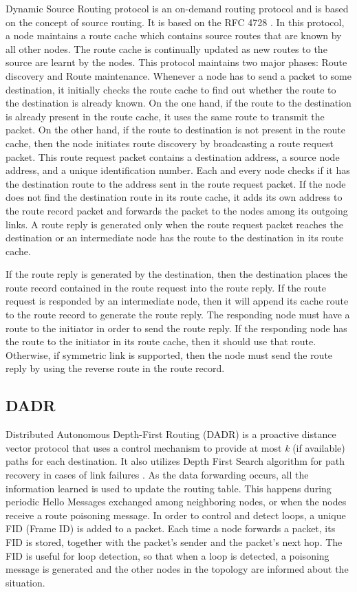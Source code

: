 \documentclass[11pt,draftclsnofoot,onecolumn]{IEEEtran}
\begin{document}
Dynamic Source Routing protocol is an on-demand routing protocol and is based on the concept of source routing. It is based on the RFC 4728 \cite{Johnson2007} . In this protocol, a node maintains a route cache which contains source routes that are known by all other nodes. The route cache is continually updated as new routes to the source are learnt by the nodes. This protocol maintains two major phases: Route discovery and Route maintenance. Whenever a node has to send a packet to some destination, it initially checks the route cache to find out whether the route to the destination is already known. On the one hand, if the route to the destination is already present in the route cache, it uses the same route to transmit the packet. On the other hand, if the route to destination is not present in the route cache, then the node initiates route discovery by broadcasting a route request packet. This route request packet contains a destination address, a source node address, and a unique identification number. Each and every node checks if it has the destination route to the address sent in the route request packet. If the node does not find the destination route in its route cache, it adds its own address to the route record packet and forwards the packet to the nodes among its outgoing links. A route reply is generated only when the route request packet reaches the destination or an intermediate node has the route to the destination in its route cache. 
	
If the route reply is generated by the destination, then the destination places the route record contained in the route request into the route reply. If the route request is responded by an intermediate node, then it will append its cache route to the route record to generate the route reply. The responding node must have a route to the initiator in order to send the route reply. If the responding node has the route to the initiator in its route cache, then it should use that route. Otherwise, if symmetric link is supported, then the node must send the route reply by using the reverse route in the route record. 

\subsection{DADR}\label{dadr}

Distributed Autonomous Depth-First Routing (DADR) \cite{Iwao2009} is a proactive distance vector protocol that uses a control mechanism to provide at most \textit{k} (if available) paths for each destination. It also utilizes Depth First Search algorithm for path recovery in cases of link failures \cite{Cespedes2012}. As the data forwarding occurs, all the information learned is used to update the routing table. This happens during periodic Hello Messages exchanged among neighboring nodes, or when the nodes receive a route poisoning message. In order to control and detect loops, a unique FID (Frame ID) is added to a packet. Each time a node forwards a packet, its FID is stored, together with the packet's sender and the packet's next hop. The FID is useful for loop detection, so that when a loop is detected, a poisoning message is generated and the other nodes in the topology are informed about the situation.
\end{document}
